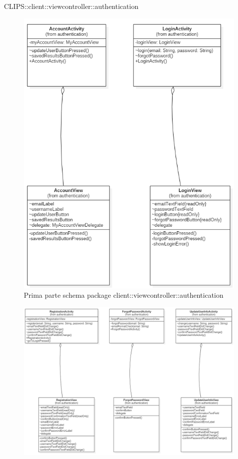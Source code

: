 \begin{componente}{CLIPS::client::viewcontroller::authentication}
\begin{figure}[h!]
	\centering
	\includegraphics[scale=0.4]{img/package/png/client--viewcontroller--authentication1.png}
	\caption{Prima parte schema package client::viewcontroller::authentication}
\end{figure}
\begin{figure}[h!]
	\centering
	\includegraphics[scale=0.4]{img/package/png/client--viewcontroller--authentication2.png}

\end{figure}
\end{componente}
